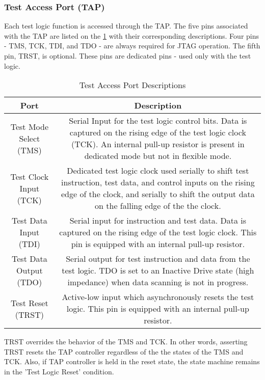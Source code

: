 \documentclass[a4paper,11pt]{article}
\begin{document}
\subsubsection{Test Access Port (TAP)}
Each test logic function is accessed through the TAP. The five pins associated with the TAP are listed on the \ref{table:tap} with their corresponding descriptions. Four pins - TMS, TCK, TDI, and TDO - are always required for JTAG operation. The fifth pin, TRST, is optional. These pins are dedicated pins - used only with the test logic. 

\begin{center}
\begin{table}[!h]
\caption{Test Access Port Descriptions}
\label{table:tap}
\begin{tabular}{|c|c|}
 \hline
 \textbf{Port} & \textbf{Description} \\ \hline
 Test Mode Select (TMS) & \multicolumn{1}{m{11cm}|}{Serial Input  for the test logic control bits. Data is captured on the rising edge of the test logic clock (TCK). An internal pull-up resistor is present in dedicated mode but not in flexible mode. }\\\hline
 Test Clock Input (TCK) & \multicolumn{1}{m{11cm}|}{Dedicated test logic clock used serially to shift test instruction, test data, and control inputs on the rising edge of the clock, and serially to shift the output data on the falling edge of the the clock.}\\\hline
Test Data Input (TDI) & \multicolumn{1}{m{11cm}|}{Serial input for instruction and test data. Data is captured on the rising edge of the test logic clock. This pin is equipped with an internal pull-up resistor.}\\\hline
Test Data Output (TDO) & \multicolumn{1}{m{11cm}|}{Serial output for test instruction and data from the test logic. TDO is set to an Inactive Drive state (high impedance) when data scanning is not in progress.}\\\hline
Test Reset (TRST) & \multicolumn{1}{m{11cm}|}{Active-low input which asynchronously resets the test logic. This pin is equipped with an internal pull-up resistor.}\\\hline
\end{tabular}
\end{table}
\end{center}

\FloatBarrier
TRST overrides the behavior of the TMS and TCK. In other words, asserting TRST resets the TAP controller regardless of the the states of the TMS and TCK. Also, if TAP controller is held in the reset state, the state machine remains in the 'Test Logic Reset' condition.
\end{document}
